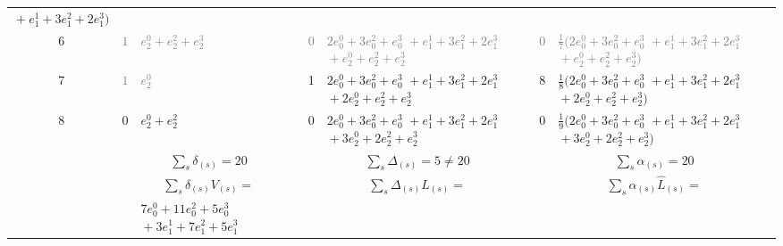 \documentclass[11pt,a4paper]{article}
\newcommand{\eji}[2]{e^{#1}_{#2}}       %
\begin{document}
\begin{center}
\begin{tabular}{c|cp{3cm}|cp{3cm}|cp{3cm}}
    ${}+\eji{1}{1}+3\eji{2}{1}+2\eji{3}{1})$
   \\[3pt]
\rowcolor{gray!15}\cellcolor{white}6 & \textcolor{gray}{$1$} & \textcolor{gray}{$\eji{0}{2}+\eji{2}{2}+\eji{3}{2}$} & \textcolor{gray}{$0$}
  & \textcolor{gray}{$2\eji{0}{0}+3\eji{2}{0}+\eji{3}{0}$\newline
    ${}+\eji{1}{1}+3\eji{2}{1}+2\eji{3}{1}$\newline
    ${}+\eji{0}{2}+\eji{2}{2}+\eji{3}{2}$}
    & \textcolor{gray}{$0$}
 & \textcolor{gray}{$\tfrac 1 7 (2\eji{0}{0}+3\eji{2}{0}+\eji{3}{0}$\newline
    ${}+\eji{1}{1}+3\eji{2}{1}+2\eji{3}{1}$\newline
    ${}+\eji{0}{2}+\eji{2}{2}+\eji{3}{2})$}
     \\[3pt]
7 & \cellcolor{gray!15}\textcolor{gray}{$1$} & \cellcolor{gray!15}\textcolor{gray}{$\eji{0}{2}$} & 1
  & $2\eji{0}{0}+3\eji{2}{0}+\eji{3}{0}$\newline
    ${}+\eji{1}{1}+3\eji{2}{1}+2\eji{3}{1}$\newline
    ${}+2\eji{0}{2}+\eji{2}{2}+\eji{3}{2}$
    & 8
  & $\tfrac 1 8 (2\eji{0}{0}+3\eji{2}{0}+\eji{3}{0}$\newline
    ${}+\eji{1}{1}+3\eji{2}{1}+2\eji{3}{1}$\newline
    ${}+2\eji{0}{2}+\eji{2}{2}+\eji{3}{2})$
    \\[3pt]
8 & 0 & $\eji{0}{2}+\eji{2}{2}$ & 0
  & $2\eji{0}{0}+3\eji{2}{0}+\eji{3}{0}$\newline
    ${}+\eji{1}{1}+3\eji{2}{1}+2\eji{3}{1}$\newline
    ${}+3\eji{0}{2}+2\eji{2}{2}+\eji{3}{2}$
    & 0
  & $\tfrac 1 9 (2\eji{0}{0}+3\eji{2}{0}+\eji{3}{0}$\newline
    ${}+\eji{1}{1}+3\eji{2}{1}+2\eji{3}{1}$\newline
    ${}+3\eji{0}{2}+2\eji{2}{2}+\eji{3}{2})$
   \\
\midrule
&\multicolumn{2}{p{3.5cm}|}{$\sum_s \delta_{(s)}=20$}
  & \multicolumn{2}{p{3.5cm}|}{$\sum_s \Delta_{(s)}=5\ne 20$}
  & \multicolumn{2}{p{3.5cm}}{$\sum_s \alpha_{(s)}=20$}
  \\
     \midrule
& \multicolumn{2}{p{3.5cm}|}{
   $\sum_s \delta_{(s)} V_{(s)}=$}
  &\multicolumn{2}{p{3.5cm}|}{$
  \sum_s \Delta_{(s)} L_{(s)}=$}
  &\multicolumn{2}{p{3.5cm}}{$
  \sum_s \alpha_{(s)} {\hat L}_{(s)}=$}
   \\
&
&
   $7\eji{0}{0}+11\eji{2}{0}+5\eji{3}{0}$\newline
    ${}+3\eji{1}{1}+7\eji{2}{1}+5\eji{3}{1}$\newline

\end{tabular}
\end{center}
\end{document}
